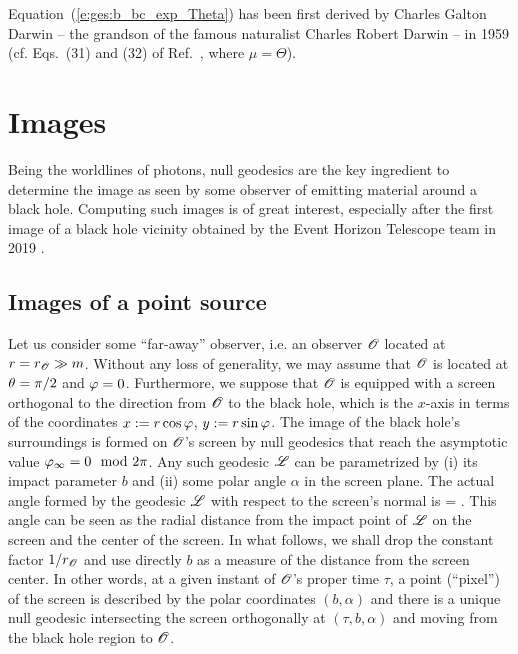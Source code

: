\begin{hist}
Equation~(\ref{e:ges:b_bc_exp_Theta}) has been first derived by
Charles Galton Darwin -- the grandson of the famous naturalist Charles Robert Darwin -- in 1959 \cite{Darwi59} (cf. Eqs.~(31) and (32) of Ref.~\cite{Darwi59}, where $\mu = \Theta$).
\end{hist}


\section{Images} \label{s:gis:images}

Being the worldlines of photons, null geodesics are the key ingredient to
determine the image as seen by some observer of emitting material around
a black hole. Computing such images is of great interest, especially after
the first image of a black hole vicinity obtained by
the Event Horizon Telescope team in 2019 \cite{EHT19a,Cardo19}.

\subsection{Images of a point source}

Let us consider some ``far-away'' observer, i.e. an observer $\mathscr{O}$ located at $r = r_{\mathscr{O}} \gg m$. Without
any loss of generality, we may assume that $\mathscr{O}$ is located at $\theta=\pi/2$ and $\varphi=0$.
Furthermore, we suppose that $\mathscr{O}$ is
equipped with a screen orthogonal to the direction from $\mathscr{O}$ to the black hole, which
is the $x$-axis in terms of the coordinates $x:=r\cos\varphi$, $y:=r\sin\varphi$.
The image of the black hole's surroundings is formed on $\mathscr{O}$'s screen by null geodesics
that reach the asymptotic value $\varphi_\infty = 0 \mod 2 \pi$. Any such geodesic $\mathscr{L}$ can be parametrized by
(i) its impact parameter $b$ and (ii) some polar angle $\alpha$ in the screen plane.
The actual angle formed by the geodesic $\mathscr{L}$ with respect to the screen's normal
is
\be
     =  .
\ee
This angle can be seen as the radial distance from the impact point of $\mathscr{L}$ on
the screen and the center of the screen. In what follows, we shall drop the constant
factor $1/r_{\mathscr{O}}$ and use directly $b$ as a measure of the distance from
the screen center.
In other words,
at a given instant of $\mathscr{O}$'s proper time $\tau$, a point (``pixel'') of the screen is
described by the polar coordinates $(b,\alpha)$ and there is a unique null geodesic intersecting
the screen orthogonally at $(\tau,b,\alpha)$ and moving from the black hole region to $\mathscr{O}$.

